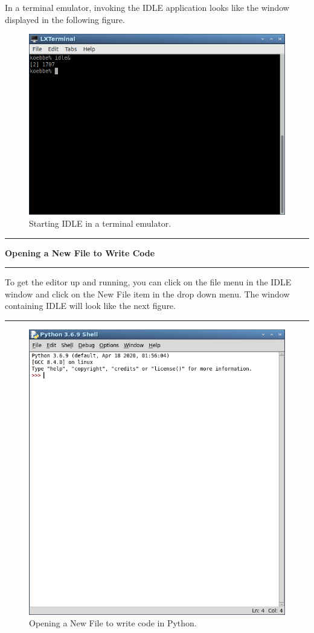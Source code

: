 \documentclass[10pt,fleqn]{article}
\begin{document}
In a terminal emulator, invoking the IDLE application looks like the window
displayed in the following figure.
\vfill
\begin{figure}[h]
\centering
\includegraphics[width=6.0in]{../images/2dplot_02.png}
\vskip0.1in
\caption{Starting IDLE in a terminal emulator.}
\end{figure}
\eject
\vskip0.1in\hrule\vskip0.1in
\noindent
{\bf Opening a New File to Write Code} 
\vskip0.1in\hrule\vskip0.1in
\noindent
To get the editor up and running, you can click on the file menu in the IDLE
window and click on the New File item in the drop down menu. The window
containing IDLE will look like the next figure. 
\vskip0.1in\hrule\vskip0.1in
\vfill
\begin{figure}[h]
\centering
\includegraphics[width=6.0in]{../images/2dplot_03.png}
\caption{Opening a New File to write code in Python.}
\end{figure}
\end{document}
